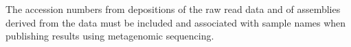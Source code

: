 \documentclass[graybox]{svmult}
\begin{document}
The accession numbers from depositions of the raw read data and of assemblies derived from the data must be included and associated with sample names when publishing results using metagenomic sequencing.  


%


%
%

% 


\end{document}
